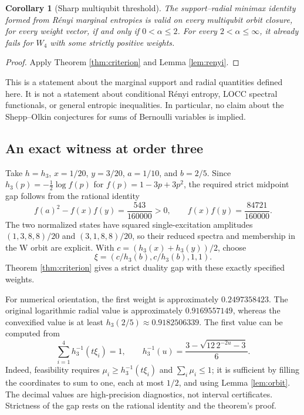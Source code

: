 \documentclass[11pt,a4paper]{article}
\newtheorem{corollary}[theorem]{Corollary}
\begin{document}
\begin{corollary}[Sharp multiqubit threshold]\label{cor:threshold}
The support--radial minimax identity formed from R\'enyi marginal
entropies is valid on every multiqubit orbit closure, for every weight
vector, if and only if \(0<\alpha\le2\).
For every \(2<\alpha\le\infty\), it already fails for \(W_4\)
with some strictly positive weights.
\end{corollary}
\begin{proof}
Apply Theorem \ref{thm:criterion} and Lemma \ref{lem:renyi}.
\end{proof}

This is a statement about the marginal support and radial quantities
defined here. It is not a statement about conditional R\'enyi entropy,
LOCC spectral functionals, or general entropic inequalities.
In particular, no claim about the Shepp--Olkin conjectures for sums
of Bernoulli variables is implied.

\subsection{An exact witness at order three}
Take \(h=h_3\), \(x=1/20\), \(y=3/20\), \(a=1/10\),
and \(b=2/5\). Since \(h_3(p)=-\tfrac12\log f(p)\) for
\(f(p)=1-3p+3p^2\), the required strict midpoint gap follows from
the rational identity
\[
 f(a)^2-f(x)f(y)=\frac{543}{160000}>0,
 \qquad f(x)f(y)=\frac{84721}{160000}.
\]
The two normalized states have squared single-excitation amplitudes
\((1,3,8,8)/20\) and \((3,1,8,8)/20\), so their reduced spectra
and membership in the W orbit are explicit. With
\(c=(h_3(x)+h_3(y))/2\), choose
\[
 \xi=(c/h_3(b),c/h_3(b),1,1).
\]
Theorem \ref{thm:criterion} gives a strict duality gap with these
exactly specified weights.

For numerical orientation, the first weight is approximately
\(0.2497358423\). The original logarithmic radial value is
approximately \(0.9169557149\), whereas the convexified value is
at least \(h_3(2/5)\approx0.9182506339\).
The first value can be computed from
\[
 \sum_{i=1}^4 h_3^{-1}(t\xi_i)=1,
 \qquad h_3^{-1}(u)=\frac{3-\sqrt{12\,2^{-2u}-3}}6.
\]
Indeed, feasibility requires \(\mu_i\ge h_3^{-1}(t\xi_i)\) and
\(\sum_i\mu_i\le1\); it is sufficient by filling the coordinates
to sum to one, each at most \(1/2\), and using Lemma \ref{lem:orbit}.
The decimal values are high-precision diagnostics, not interval
certificates. Strictness of the gap rests on the rational identity
and the theorem's proof.
\end{document}
